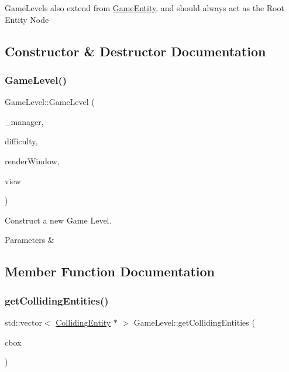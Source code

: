Game\+Levels also extend from \mbox{\hyperlink{class_game_entity}{Game\+Entity}}, and should always act as the Root Entity Node 

\subsection{Constructor \& Destructor Documentation}
\mbox{\label{class_game_level_a4f4effafa8e36221e9591f2ef4e75654}} 
\subsubsection{\texorpdfstring{GameLevel()}{GameLevel()}}
{\footnotesize\ttfamily Game\+Level\+::\+Game\+Level (\begin{DoxyParamCaption}\item[{\mbox{\hyperlink{class_game_manager}{Game\+Manager}} $\ast$}]{\+\_\+manager,  }\item[{float}]{difficulty,  }\item[{\mbox{\hyperlink{classsf_1_1_render_window}{sf\+::\+Render\+Window}} \&}]{render\+Window,  }\item[{\mbox{\hyperlink{classsf_1_1_view}{sf\+::\+View}} \&}]{view }\end{DoxyParamCaption})}



Construct a new Game Level. 


\begin{DoxyParams}{Parameters}
{\em } & \\
\hline
\end{DoxyParams}


\subsection{Member Function Documentation}
\mbox{\label{class_game_level_aa3342e1923f751cdcb9bc9795f27ea33}} 
\subsubsection{\texorpdfstring{getCollidingEntities()}{getCollidingEntities()}}
{\footnotesize\ttfamily std\+::vector$<$ \mbox{\hyperlink{class_colliding_entity}{Colliding\+Entity}} $\ast$ $>$ Game\+Level\+::get\+Colliding\+Entities (\begin{DoxyParamCaption}\item[{\mbox{\hyperlink{class_collision_box}{Collision\+Box}}}]{cbox }\end{DoxyParamCaption})}



